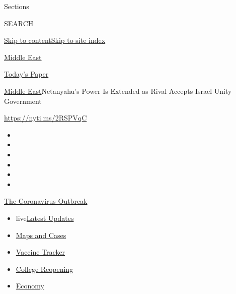 Sections

SEARCH

\protect\hyperlink{site-content}{Skip to
content}\protect\hyperlink{site-index}{Skip to site index}

\href{https://www.nytimes.com/section/world/middleeast}{Middle East}

\href{https://myaccount.nytimes.com/auth/login?response_type=cookie\&client_id=vi}{}

\href{https://www.nytimes.com/section/todayspaper}{Today's Paper}

\href{/section/world/middleeast}{Middle East}\textbar{}Netanyahu's Power
Is Extended as Rival Accepts Israel Unity Government

\url{https://nyti.ms/2RSPVqC}

\begin{itemize}
\item
\item
\item
\item
\item
\item
\end{itemize}

\href{https://www.nytimes.com/news-event/coronavirus?action=click\&pgtype=Article\&state=default\&region=TOP_BANNER\&context=storylines_menu}{The
Coronavirus Outbreak}

\begin{itemize}
\tightlist
\item
  live\href{https://www.nytimes.com/2020/08/04/world/coronavirus-covid-19.html?action=click\&pgtype=Article\&state=default\&region=TOP_BANNER\&context=storylines_menu}{Latest
  Updates}
\item
  \href{https://www.nytimes.com/interactive/2020/us/coronavirus-us-cases.html?action=click\&pgtype=Article\&state=default\&region=TOP_BANNER\&context=storylines_menu}{Maps
  and Cases}
\item
  \href{https://www.nytimes.com/interactive/2020/science/coronavirus-vaccine-tracker.html?action=click\&pgtype=Article\&state=default\&region=TOP_BANNER\&context=storylines_menu}{Vaccine
  Tracker}
\item
  \href{https://www.nytimes.com/2020/08/02/us/covid-college-reopening.html?action=click\&pgtype=Article\&state=default\&region=TOP_BANNER\&context=storylines_menu}{College
  Reopening}
\item
  \href{https://www.nytimes.com/live/2020/08/03/business/stock-market-today-coronavirus?action=click\&pgtype=Article\&state=default\&region=TOP_BANNER\&context=storylines_menu}{Economy}
\end{itemize}

